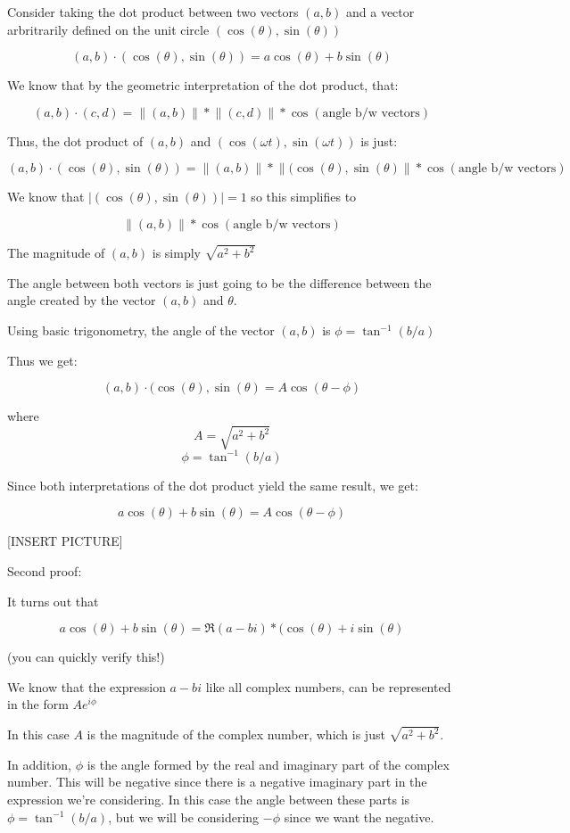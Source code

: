 \documentclass{report}
\begin{document}
{Consider taking the dot product between two vectors $(a,b)$ and a vector arbritrarily defined on the unit circle $(\cos(\theta),\sin(\theta))$

$$(a,b)\cdot(\cos(\theta),\sin(\theta)) = a\cos(\theta) + b\sin(\theta)$$

We know that by the geometric interpretation of the dot product, that:

$$(a,b)\cdot(c,d) = \lVert(a,b)\rVert*\lVert(c,d)\rVert*\cos(\text{angle b/w vectors})$$

Thus, the dot product of $(a,b)$ and $(\cos(\omega t),\sin(\omega t))$ is just:

$$(a,b)\cdot(\cos(\theta),\sin(\theta)) = \lVert(a,b)\rVert*\lVert(\cos(\theta),\sin(\theta)\rVert*\cos(\text{angle b/w vectors})$$

We know that $\lvert(\cos(\theta),\sin(\theta))\rvert =1$ so this simplifies to 

$$\lVert(a,b)\rVert*\cos(\text{angle b/w vectors})$$

The magnitude of $(a,b)$ is simply $\sqrt{a^2+b^2}$

The angle between both vectors is just going to be the difference between the angle created by the vector $(a,b)$ and $\theta$. 

Using basic trigonometry, the angle of the vector $(a,b)$ is $\phi = \tan^{-1}(b/a)$

Thus we get:

$$(a,b)\cdot(\cos(\theta),\sin(\theta) = A\cos(\theta - \phi)$$

where
$$A = \sqrt{a^2+b^2}$$
$$\phi = \tan^{-1}(b/a)$$

Since both interpretations of the dot product yield the same result, we get:

$$a\cos(\theta) + b\sin(\theta) = A\cos(\theta - \phi)$$

[INSERT PICTURE]

Second proof:

It turns out that

$$a\cos(\theta) + b\sin(\theta) = \Re{(a-bi)*(\cos(\theta) + i\sin(\theta)}$$

(you can quickly verify this!)

We know that the expression $a-bi$ like all complex numbers, can be represented in the form $Ae^{i\phi}$

In this case $A$ is the magnitude of the complex number, which is just $\sqrt{a^2+b^2}$.

In addition, $\phi$ is the angle formed by the real and imaginary part of the complex number. This will be negative since there is a negative imaginary part in the expression we're considering. In this case the angle between these parts is $\phi = \tan^{-1}(b/a)$, but we will be considering $-\phi$ since we want the negative.

}
\end{document}
